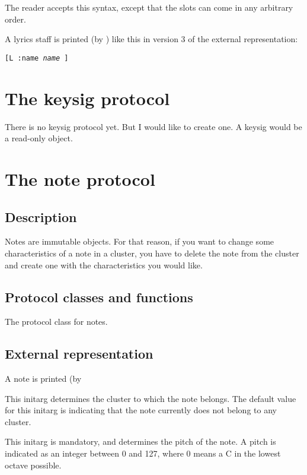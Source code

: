 The reader accepts this syntax, except that the slots can come in any
arbitrary order. 

A lyrics staff is printed (by ) like this in
version 3 of the external representation:

\texttt{[L :name \textit{name} ]}

\section{The keysig protocol}

There is no keysig protocol yet.  But I would like to create one.  A
keysig would be a read-only object.  

\section{The note protocol}

\subsection{Description}

Notes are immutable objects.  For that reason, if you want to change
some characteristics of a note in a cluster, you have to delete the
note from the cluster and create one with the characteristics you
would like. 

\subsection{Protocol classes and functions}


The protocol class for notes. 


\subsection{External representation}

A note is printed (by 


This initarg determines the cluster to which the note belongs.  The
default value for this initarg is  indicating that the
note currently does not belong to any cluster.


This initarg is mandatory, and determines the pitch of the note.
A pitch is indicated as an integer between 0 and 127, where 0 means a
C in the lowest octave possible. 


